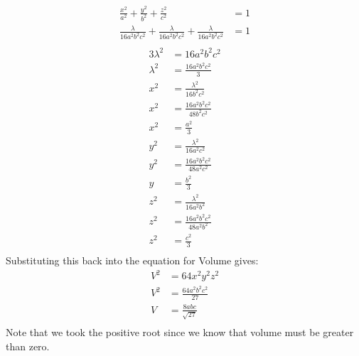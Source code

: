 \documentclass[10pt,\jkfside,a4paper]{article}
\begin{document}
\begin{enumerate}
\begin{equation}
\begin{split}
\frac{x^{2}}{a^2} + \frac{y^{2}}{b^2} + \frac{z^2}{c^2} &= 1 \\
\frac{\lambda}{16a^2b^2c^2} + \frac{\lambda}{16a^2b^2c^2} + \frac{\lambda}{16a^2b^2c^2} &= 1 \\
\end{split}
\end{equation}
\begin{equation}
\begin{split}
3\lambda^2 &= 16a^2b^2c^2 \\
\lambda^2 &= \frac{16a^2b^2c^2}{3} \\
x^{2} &= \frac{\lambda^2}{16b^2c^2} \\
x^{2} &= \frac{16a^2b^2c^2}{48b^2c^2} \\
x^{2} &= \frac{a^2}{3} \\
y^{2} &= \frac{\lambda^2}{16a^2c^2} \\
y^{2} &= \frac{16a^2b^2c^2}{48a^2c^2} \\
y &= \frac{b^2}{3} \\
z^2 &= \frac{\lambda^2}{16a^2b^2} \\
z^2 &= \frac{16a^2b^2c^2}{48a^2b^2} \\
z^2 &= \frac{c^2}{3} \\
\end{split}
\end{equation}
Substituting this back into the equation for Volume gives:
\begin{equation}
\begin{split}
V^2 &= 64 x^{2}y^{2}z^2 \\
V^2 &= \frac{64a^2b^2c^2}{27} \\
V &= \frac{8abc}{\sqrt{27}} \\
\end{split}
\end{equation}
Note that we took the positive root since we know that volume must be greater than zero.


\end{enumerate}
\end{document}
